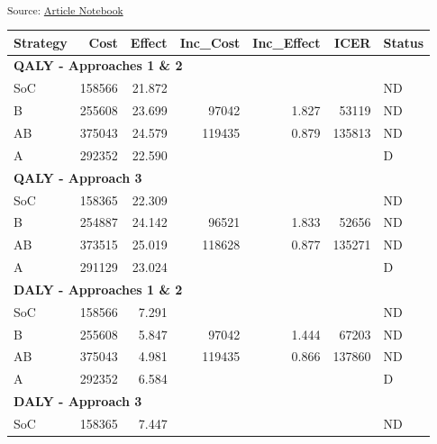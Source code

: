 \documentclass[
]{agujournal2019}
\begin{document}
\textsubscript{Source:
\href{https://graveja0.github.io/dalys/index.qmd.html}{Article
Notebook}}

\begin{table}
\centering
\begin{tabular}{l|r|r|r|r|r|l}
\hline
Strategy & Cost & Effect & Inc\_Cost & Inc\_Effect & ICER & Status\\
\hline
\multicolumn{7}{l}{\textbf{QALY - Approaches 1 \& 2}}\\
\hline
\hspace{1em}SoC & 158566 & 21.872 &  &  &  & \vphantom{1} ND\\
\hline
\hspace{1em}B & 255608 & 23.699 & 97042 & 1.827 & 53119 & \vphantom{1} ND\\
\hline
\hspace{1em}AB & 375043 & 24.579 & 119435 & 0.879 & 135813 & \vphantom{1} ND\\
\hline
\hspace{1em}A & 292352 & 22.590 &  &  &  & \vphantom{1} D\\
\hline
\multicolumn{7}{l}{\textbf{QALY - Approach 3}}\\
\hline
\hspace{1em}SoC & 158365 & 22.309 &  &  &  & ND\\
\hline
\hspace{1em}B & 254887 & 24.142 & 96521 & 1.833 & 52656 & ND\\
\hline
\hspace{1em}AB & 373515 & 25.019 & 118628 & 0.877 & 135271 & ND\\
\hline
\hspace{1em}A & 291129 & 23.024 &  &  &  & D\\
\hline
\multicolumn{7}{l}{\textbf{DALY - Approaches 1 \& 2}}\\
\hline
\hspace{1em}SoC & 158566 & 7.291 &  &  &  & ND\\
\hline
\hspace{1em}B & 255608 & 5.847 & 97042 & 1.444 & 67203 & ND\\
\hline
\hspace{1em}AB & 375043 & 4.981 & 119435 & 0.866 & 137860 & ND\\
\hline
\hspace{1em}A & 292352 & 6.584 &  &  &  & D\\
\hline
\multicolumn{7}{l}{\textbf{DALY - Approach 3}}\\
\hline
\hspace{1em}SoC & 158365 & 7.447 &  &  &  & ND\\

\end{tabular}
\end{table}
\end{document}
